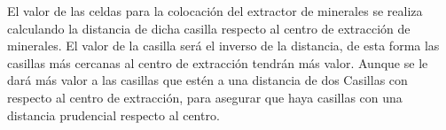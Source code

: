 El valor de las celdas para la colocación del extractor de minerales se realiza calculando la distancia de dicha casilla respecto al centro de extracción de minerales.
El valor de la casilla será el inverso de la distancia, de esta forma las casillas más cercanas al centro de extracción tendrán más valor.
Aunque se le dará más valor a las casillas que estén a una distancia de dos Casillas con respecto al centro de extracción, para asegurar que haya casillas con una distancia prudencial respecto al centro.
